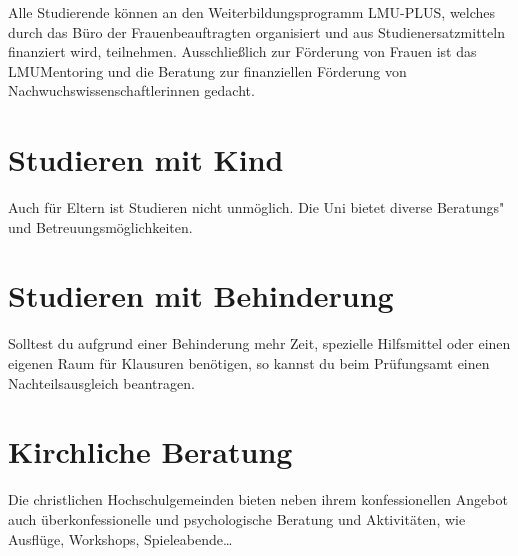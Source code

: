 Alle Studierende können an den Weiterbildungsprogramm LMU-PLUS, welches durch das Büro der Frauenbeauftragten organisiert und aus Studienersatzmitteln finanziert wird, teilnehmen. Ausschließlich zur Förderung von Frauen ist das LMUMentoring und die Beratung zur finanziellen Förderung von Nachwuchswissenschaftlerinnen gedacht.

\begin{urlList}
\end{urlList}

\section{Studieren mit Kind}

Auch für Eltern ist Studieren nicht unmöglich. Die Uni bietet diverse Beratungs"~ und Betreuungsmöglichkeiten.

\begin{urlList}
\end{urlList}

\section{Studieren mit Behinderung}

Solltest du aufgrund einer Behinderung mehr Zeit, spezielle Hilfsmittel oder einen eigenen Raum für Klausuren benötigen, so kannst du beim Prüfungsamt einen Nachteilsausgleich beantragen.

\begin{urlList}
\end{urlList}



\section{Kirchliche Beratung}
Die christlichen Hochschulgemeinden bieten neben ihrem konfessionellen Angebot auch überkonfessionelle und psychologische Beratung und Aktivitäten, wie Ausflüge, Workshops, Spieleabende\ldots

